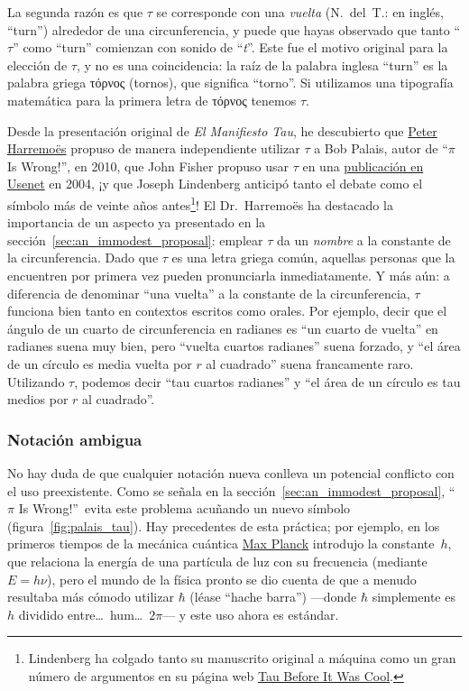 La segunda razón es que $\tau$ se corresponde con una \emph{vuelta} (N.~del~T.: en inglés, ``turn'') alrededor de una circunferencia, y puede que hayas observado que tanto ``$\tau$'' como ``turn'' comienzan con sonido de ``\emph{t}''. Este fue el motivo original para la elección de $\tau$, y no es una coincidencia: la raíz de la palabra inglesa ``turn'' es la palabra griega τόρνος (tornos), que significa ``torno''. Si utilizamos una tipografía matemática para la primera letra de τόρνος tenemos $\tau$.

Desde la presentación original de \emph{El Manifiesto Tau}, he descubierto que \href{http://www.harremoes.dk/Peter/}{Peter Harremo\"{e}s} propuso de manera independiente utilizar $\tau$ a Bob Palais, autor de ``$\pi$ Is Wrong!'', en 2010, que John Fisher propuso usar $\tau$ en una \href{https://groups.google.com/forum/#!msg/sci.math/c-DHmJHSA0A/sLCoOtHB1UAJ}{publicación en Usenet} en 2004, ¡y que Joseph Lindenberg anticipó tanto el debate como el símbolo más de veinte años antes\footnote{Lindenberg ha colgado tanto su manuscrito original a máquina como un gran número de argumentos en su página web \href{http://sites.google.com/site/taubeforeitwascool/}{Tau Before It Was Cool}.}! El Dr.~Harremo\"{e}s ha destacado la importancia de un aspecto ya presentado en la sección~\ref{sec:an_immodest_proposal}: emplear $\tau$ da un \emph{nombre} a la constante de la circunferencia. Dado que $\tau$ es una letra griega común, aquellas personas que la encuentren por primera vez pueden pronunciarla inmediatamente. Y más aún: a diferencia de denominar ``una vuelta'' a la constante de la circunferencia, $\tau$ funciona bien tanto en contextos escritos como orales. Por ejemplo, decir que el ángulo de un cuarto de circunferencia en radianes es ``un cuarto de vuelta'' en radianes suena muy bien, pero ``vuelta cuartos radianes'' suena forzado, y ``el área de un círculo es media vuelta por $r$ al cuadrado'' suena francamente raro. Utilizando $\tau$, podemos decir ``tau cuartos radianes'' y ``el área de un círculo es tau medios por $r$ al cuadrado''.

    \subsubsection{Notación ambigua} %
    \label{sec:ambiguous_notation}

No hay duda de que cualquier notación nueva conlleva un potencial conflicto con el uso preexistente. Como se señala en la sección~\ref{sec:an_immodest_proposal}, ``$\pi$ Is Wrong!''\ evita este problema acuñando un nuevo símbolo (figura~\ref{fig:palais_tau}). Hay precedentes de esta práctica; por ejemplo, en los primeros tiempos de la mecánica cuántica \href{https://es.wikipedia.org/wiki/Max_Planck}{Max Planck} introdujo la constante~$h$, que relaciona la energía de una partícula de luz con su frecuencia (mediante $E = h\nu$), pero el mundo de la física pronto se dio cuenta de que a menudo resultaba más cómodo utilizar $\hbar$ (léase ``hache barra'') ---donde $\hbar$ simplemente es $h$ dividido entre\ldots\ hum\ldots\ $2\pi$--- y este uso ahora es estándar. 


